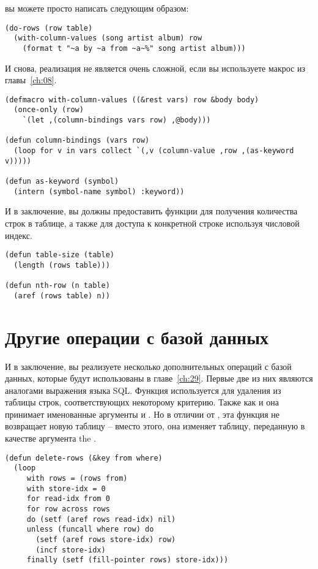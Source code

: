 вы можете просто написать следующим образом:

\begin{lstlisting}
(do-rows (row table)
  (with-column-values (song artist album) row
    (format t "~a by ~a from ~a~%" song artist album)))
\end{lstlisting}

И снова, реализация не является очень сложной, если вы используете макрос 
из главы~\ref{ch:08}.

\begin{lstlisting}
(defmacro with-column-values ((&rest vars) row &body body)
  (once-only (row)
    `(let ,(column-bindings vars row) ,@body)))

(defun column-bindings (vars row)
  (loop for v in vars collect `(,v (column-value ,row ,(as-keyword v)))))

(defun as-keyword (symbol)
  (intern (symbol-name symbol) :keyword))
\end{lstlisting}

И в заключение, вы должны предоставить функции для получения количества строк в таблице, а
также для доступа к конкретной строке используя числовой индекс.

\begin{lstlisting}
(defun table-size (table)
  (length (rows table)))

(defun nth-row (n table)
  (aref (rows table) n))
\end{lstlisting}

\section{Другие операции с базой данных}

И в заключение, вы реализуете несколько дополнительных операций с базой данных, которые
будут использованы в главе~\ref{ch:29}.  Первые две из них являются аналогами выражения
 языка SQL.  Функция  используется для удаления из таблицы
строк, соответствующих некоторому критерию.  Также как и  она принимает
именованные аргументы  и .  Но в отличии от , эта
функция не возвращает новую таблицу -- вместо этого, она изменяет таблицу, переданную в
качестве аргумента the .

\begin{lstlisting}
(defun delete-rows (&key from where)
  (loop
     with rows = (rows from)
     with store-idx = 0
     for read-idx from 0
     for row across rows
     do (setf (aref rows read-idx) nil)
     unless (funcall where row) do
       (setf (aref rows store-idx) row)
       (incf store-idx)
     finally (setf (fill-pointer rows) store-idx)))
\end{lstlisting}

